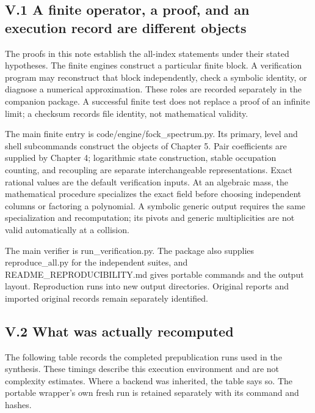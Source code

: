 \hypertarget{v.1-a-finite-operator-a-proof-and-an-execution-record-are-different-objects}{%
\subsection{V.1 A finite operator, a proof, and an execution record are different objects}\label{v.1-a-finite-operator-a-proof-and-an-execution-record-are-different-objects}}

The proofs in this note establish the all-index statements under their stated hypotheses. The finite engines construct a particular finite block. A verification program may reconstruct that block independently, check a symbolic identity, or diagnose a numerical approximation. These roles are recorded separately in the companion package. A successful finite test does not replace a proof of an infinite limit; a checksum records file identity, not mathematical validity.

The main finite entry is code/engine/fock\_spectrum.py. Its primary, level and shell subcommands construct the objects of Chapter 5. Pair coefficients are supplied by Chapter 4; logarithmic state construction, stable occupation counting, and recoupling are separate interchangeable representations. Exact rational values are the default verification inputs. At an algebraic mass, the mathematical procedure specializes the exact field before choosing independent columns or factoring a polynomial. A symbolic generic output requires the same specialization and recomputation; its pivots and generic multiplicities are not valid automatically at a collision.

The main verifier is run\_verification.py. The package also supplies reproduce\_all.py for the independent suites, and README\_REPRODUCIBILITY.md gives portable commands and the output layout. Reproduction runs into new output directories. Original reports and imported original records remain separately identified.

\hypertarget{v.2-what-was-actually-recomputed}{%
\subsection{V.2 What was actually recomputed}\label{v.2-what-was-actually-recomputed}}

The following table records the completed prepublication runs used in the synthesis. These timings describe this execution environment and are not complexity estimates. Where a backend was inherited, the table says so. The portable wrapper's own fresh run is retained separately with its command and hashes.

